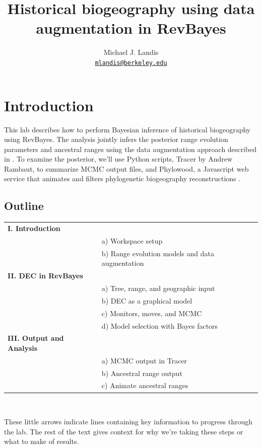 \documentclass[11pt]{article}
\newcommand{\impmark}{\strut\vadjust{\domark}}
\newcommand{\domark}{%
  \vbox to 0pt{
    \kern-\dp\strutbox
    \smash{\llap{$\rightarrow$\kern1em}}
    \vss
  }%
}
\begin{document}


\title{Historical biogeography using data augmentation in RevBayes}
\author{Michael J. Landis \\ \href{mailto:mlandis@berkeley.edu}{\texttt{mlandis@berkeley.edu}}}
\maketitle

\section{Introduction}

This lab describes how to perform Bayesian inference of historical biogeography using RevBayes. The analysis jointly infers the posterior range evolution parameters and ancestral ranges using the data augmentation approach described in \citet{landis13}.
To examine the posterior, we'll use Python scripts, Tracer by Andrew Rambaut, to summarize MCMC output files, and Phylowood, a Javascript web service that animates and filters phylogenetic biogeography reconstructions \citep{landis14}.


\subsection*{\textbf{Outline}}
\begin{tabular}{ll}
{\bf I. Introduction} & \\
& a) Workspace setup \\
& b) Range evolution models and data augmentation \\
{\bf II. DEC in RevBayes} & \\
& a) Tree, range, and geographic input \\
& b) DEC as a graphical model \\
& c) Monitors, moves, and MCMC \\
& d) Model selection with Bayes factors \\
{\bf III. Output and Analysis} & \\
& a) MCMC output in Tracer \\
& b) Ancestral range output \\
& c) Animate ancestral ranges \\
\end{tabular}

\noindent \\ \impmark These little arrows indicate lines containing key information to progress through the lab. The rest of the text gives context for why we're taking these steps or what to make of results.
\end{document}
